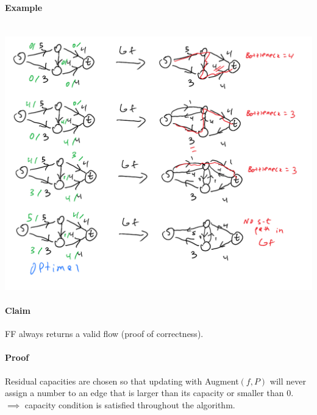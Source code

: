 \documentclass[12 pt]{article}
\begin{document}
        \paragraph{Example}~
        \\ \includegraphics[width=\textwidth]{i13.pdf}
        \paragraph{Claim} FF always returns a valid flow (proof of
        correctness).
        \paragraph{Proof} Residual capacities are chosen so that
        updating with Augment$(f,P)$ will never assign a number to an
        edge that is larger than its capacity or smaller than
        $0$. $\implies$ capacity condition is satisfied throughout the
        algorithm.
\end{document}
